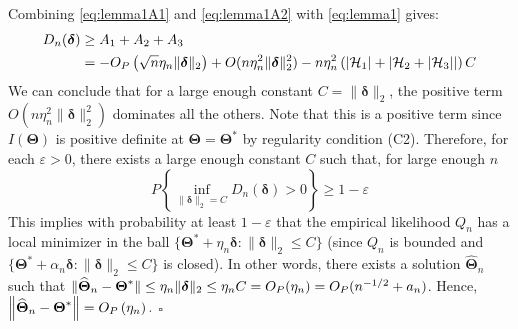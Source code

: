 \documentclass[12pt,letter]{article}\usepackage[]{graphicx}\usepackage[]{color}
\newcommand{\bTheta}{\boldsymbol{\Theta}}
\newcommand{\bThetastar}{\boldsymbol{\Theta}^{*}}
\newcommand{\bdelta}{\boldsymbol{\delta}}
\begin{document}
Combining \eqref{eq:lemma1A1} and \eqref{eq:lemma1A2} with \eqref{eq:lemma1} gives:
\[
\begin{aligned}D_{n}(\boldsymbol{\delta}) & \geq A_{1}+A_{2}+A_{3}\\
& =-\Op\left(\sqrt{n}\eta_{n} \|\bdelta\|_2 \right)+O(n \eta_n^2 \|\bdelta\|_2^2)-n\eta_{n}^{2}\left(\left|\mathcal{H}_{1}\right|+\left|\mathcal{H}_{2}+\left|\mathcal{H}_{3}\right|\right|\right)C
\end{aligned}
\]
We can conclude that for a large enough constant $C=\|\bdelta\|_2$, the positive term $O(n \eta_n^2 \|\bdelta\|_2^2)$ dominates all the others. Note that this is a positive term since $I(\bTheta)$ is positive definite at $\bTheta = \bTheta^*$ by regularity condition (C2).  
Therefore, for each $\varepsilon>0$, there exists a large enough constant $C$ such that, for large enough $n$
\[
P\left\{ \underset{\|\bdelta\|_2=C}{\inf}D_{n}\left(\boldsymbol{\delta}\right) > 0\right\} \geq 1-\varepsilon
\]
This implies with probability at least $1-\varepsilon$ that the empirical
likelihood $Q_{n}$ has a local minimizer in the ball $\{\boldsymbol{\Theta}^{*}+\eta_{n}\mathbf{\bdelta}:\|\mathbf{\bdelta}\|_2\leq C\}$
(since $Q_{n}$ is bounded and $\{\boldsymbol{\Theta}^{*}+\alpha_{n}\bdelta:\|\bdelta\|_2\leq C\}$
is closed). In other words, there exists a solution $\widehat{\bTheta}_{n}$
such that $\|\widehat{\boldsymbol{\Theta}}_{n}-\boldsymbol{\Theta}^{*}\|\leq\eta_{n}\|\bdelta\|_2\leq\eta_{n}C=\Op(\eta_{n})=\Op(n^{-1/2}+a_{n})$.
Hence, $\left\Vert \widehat{\boldsymbol{\Theta}}_{n}-\boldsymbol{\Theta}^{*}\right\Vert =O_{P}\left(\eta_{n}\right).$ $\square$
\end{document}
